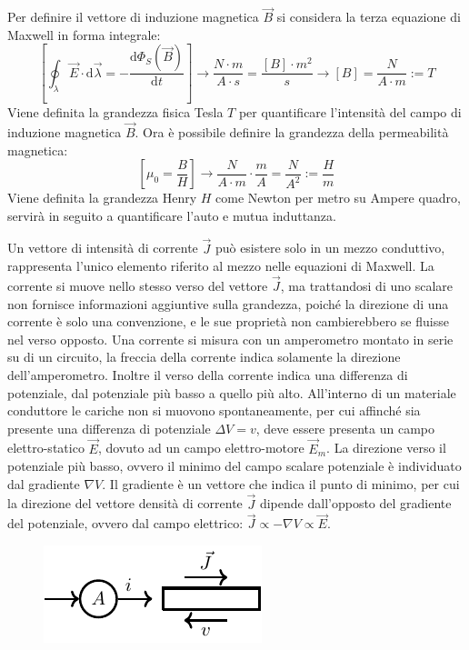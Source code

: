 \documentclass{article}
\newcommand{\df}{\mathrm{d}}
\numberwithin{equation}{subsection}
\begin{document}
Per definire il vettore di induzione magnetica $\vec{B}$ si considera la terza equazione di Maxwell in forma integrale:
\begin{equation*}
    \displaystyle\left[\oint_{\lambda}\vec{E}\cdot \df\vec\lambda=-\frac{\df\Phi_S(\vec{B})}{\df t}\right]\to\frac{N\cdot m}{A\cdot s}=\frac{[B]\cdot m^2}{s}\to[B]=\frac{N}{A\cdot m}:=T
\end{equation*}
Viene definita la grandezza fisica Tesla $T$ per quantificare l'intensità del campo di induzione magnetica $\vec{B}$. Ora è possibile definire la grandezza della permeabilità 
magnetica:
\begin{equation*}
    \displaystyle\left[\mu_0=\frac{{B}}{{H}}\right]\to\frac{N}{A\cdot m}\cdot\frac{m}{A}=\frac{N}{A^2}:=\frac{H}{m}
\end{equation*}
Viene definita la grandezza Henry $H$ come Newton per metro su Ampere quadro, servirà in seguito a quantificare l'auto e mutua induttanza. 

Un vettore di intensità di corrente $\vec{J}$ può esistere solo in un mezzo conduttivo, rappresenta l'unico elemento riferito al mezzo nelle equazioni di Maxwell. La corrente 
si muove nello stesso verso del vettore $\vec{J}$, ma trattandosi di uno scalare non fornisce informazioni aggiuntive sulla grandezza, poiché la direzione di una corrente è 
solo una convenzione, e le sue proprietà non cambierebbero se fluisse nel verso opposto. Una corrente si misura con un amperometro montato in serie su di un circuito, la freccia 
della corrente indica solamente la direzione dell'amperometro. Inoltre il verso della corrente indica una differenza di potenziale, dal potenziale più basso a quello 
più alto. All'interno di un materiale conduttore le cariche non si muovono spontaneamente, per cui affinché sia presente una differenza di potenziale $\Delta V=v$, deve essere 
presenta un campo elettro-statico $\vec{E}$, dovuto ad un campo elettro-motore $\vec{E}_m$. La direzione verso il potenziale più basso, ovvero il minimo del campo scalare 
potenziale è individuato dal gradiente $\nabla V$. Il gradiente è un vettore che indica il punto di minimo, per cui la direzione del vettore densità di corrente $\vec{J}$ 
dipende dall'opposto del gradiente del potenziale, ovvero dal campo elettrico: $\vec{J}\propto-\nabla V\propto\vec{E}$. 

\begin{figure}[H]%
    \centering
    \includegraphics{amperometro.pdf}
    \label{fig:amperometro}
\end{figure}
\end{document}
